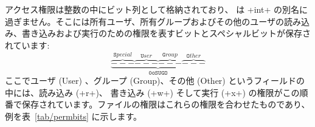 アクセス権限は整数の中にビット列として格納されており、 は \ml+int+ の別名に過ぎません。そこには所有ユーザ、所有グループおよびその他のユーザの読み込み、書き込みおよび実行のための権限を表すビットとスペシャルビットが保存されています:
%
{%
\begin{displaymath}
\underbrace
{\overbrace{---}^{\texttt Special}
 \overbrace{---}^{\texttt User}
 \overbrace{---}^{\texttt Group}
 \overbrace{---}^{\texttt Other}}_{\texttt{0oSUGO}}
\end{displaymath}
}
%
ここでユーザ (User) 、グループ (Group)、その他 (Other) というフィールドの中には、読み込み (\ml+r+)、 書き込み (\ml+w+) そして実行 (\ml+x+) の権限がこの順番で保存されています。ファイルの権限はこれらの権限を合わせたものであり、例を表~\ref{tab/permbits} に示します。
